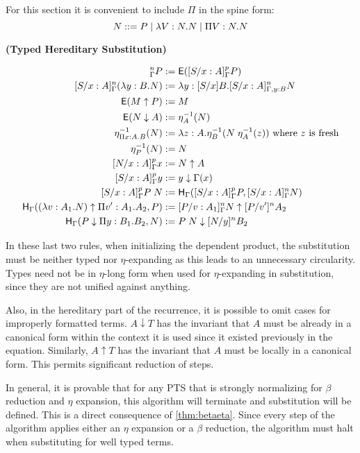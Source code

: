For this section it is convenient to include $\Pi$ in the spine form: 
\[
N ::= P 
\; | \; \lambda V : N . N 
\; | \; \Pi V : N . N 
\]


\begin{definition}
\textbf{(Typed Hereditary Substitution)}

\begin{align}
[S / x : A]^n_{\Gamma } P &:= \m{E}([S / x : A]^p_{\Gamma } P)
\\
[S / x : A]^n_{\Gamma } (\lambda y : B . N) &:= \lambda y: [S / x ] B. [S / x : A]^n_{\Gamma, y : B} N
\\
\m{E}(M \uparrow P) &:= M
\\
\m{E}(N \downarrow A) &:= \eta^{-1}_A (N)
\\
\eta^{-1}_{\Pi x : A . B}(N) &:= \lambda z : A . \eta^{-1}_B(N \; \eta^{-1}_A(z))
 \text{ where $z$ is fresh}
\\
\eta^{-1}_{P}(N) &:= N
\\
[ N / x : A]^p_{\Gamma} x &:= N \uparrow A
\\
[S / x : A]^p_{\Gamma} y &:= y \downarrow \Gamma(x)
\\
[S / x : A]^p_{\Gamma } P\;N &:= 
\m{H}_{\Gamma} ( [S/x : A]^p_{\Gamma} P , [S/x : A]^n_{\Gamma} N) 
\\
\m{H}_{\Gamma} ((\lambda v : A_1 . N) \uparrow \Pi v' : A_1 . A_2 , P) 
&:= [P/v : A_1]^n_{\Gamma} N \uparrow [P/v']^n A_2
\\
\m{H}_{\Gamma}(P \downarrow \Pi y : B_1 . B_2 , N) &:= P\; N \downarrow [N/y]^nB_2
\end{align}

\label{def:tyhered}
\end{definition} 

In these last two rules, when initializing the dependent product, the substitution must be neither typed
nor $\eta$-expanding as this leads to an unnecessary circularity.  Types need not be in $\eta$-long form
when used for $\eta$-expanding in substitution, since they are not unified against anything.

Also, in the hereditary part of the recurrence, 
it is possible to omit cases for improperly formatted terms.  $A \downarrow T$ has the invariant that
$A$ must be already in a canonical form within the context it is used since it existed previously in the
equation.  Similarly, $A \uparrow T$ has the invariant that $A$ must be locally in a canonical form.
This permits significant reduction of steps.

In general, it is provable that for any PTS that is strongly normalizing for $\beta$ reduction and 
$\eta$ expansion, this algorithm will terminate and substitution will be defined.  
This is a direct consequence of \ref{thm:betaeta}.  
Since every step of the algorithm applies either an $\eta$ expansion or 
a $\beta$ reduction, the algorithm must halt when substituting for well typed terms.

